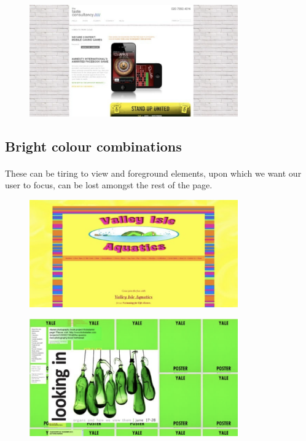 \begin{figure}[H]
    \centering
    \includegraphics[width=0.8\textwidth]{figures/bad-colours-light-background-2}
    \label{fig:bad-colours-light-background-2}
    \caption{}
\end{figure}


\subsection{Bright colour combinations}
\paragraph{} These can be tiring to view and foreground elements, upon which we want our user to focus, can be lost amongst the rest of the page.


\begin{figure}[H]
    \centering
    \includegraphics[width=0.8\textwidth]{figures/bad-colours-bright-colours-1}
    \label{fig:bad-colours-bright-colours-1}
    \caption{}
\end{figure}


\begin{figure}[H]
    \centering
    \includegraphics[width=0.8\textwidth]{figures/bad-colours-bright-colours-2}
    \label{fig:bad-colours-bright-colours-2}
    \caption{}
\end{figure}


